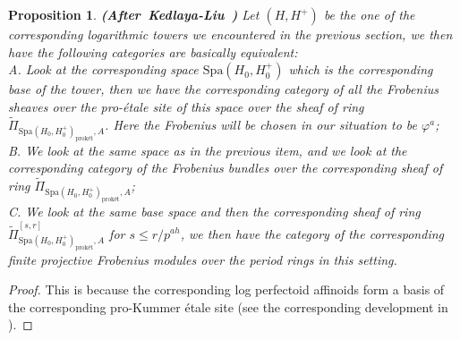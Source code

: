 \documentclass[12pt]{amsart}
\newtheorem{proposition}[theorem]{Proposition}
\theoremstyle{definition}
\numberwithin{equation}{section}
\begin{document}
\begin{proposition} \mbox{\bf{(After Kedlaya-Liu \cite[Lemma 5.4.11]{KL16})}}
Let $(H,H^+)$ be the one of the corresponding logarithmic towers we encountered in the previous section, we then have the following categories are basically equivalent:\\
\noindent A. Look at the corresponding space $\mathrm{Spa}(H_0,H_0^+)$ which is the corresponding base of the tower, then we have the corresponding category of all the Frobenius sheaves over the pro-\'etale site of this space over the sheaf of ring $\widetilde{\Pi}_{\mathrm{Spa}(H_0,H_0^+)_\text{prok\'et},A}$. Here the Frobenius will be chosen in our situation to be $\varphi^a$;\\
\noindent B. We look at the same space as in the previous item, and we look at the corresponding category of the Frobenius bundles over the corresponding sheaf of ring $\widetilde{\Pi}_{\mathrm{Spa}(H_0,H_0^+)_\text{prok\'et},A}$;\\
\noindent C. We look at the same base space and then the corresponding sheaf of ring $\widetilde{\Pi}^{[s,r]}_{\mathrm{Spa}(H_0,H_0^+)_\text{prok\'et},A}$ for $s\leq r/p^{ah}$, we then have the category of the corresponding finite projective Frobenius modules over the period rings in this setting.\\
\end{proposition}


\begin{proof}
This is because the corresponding log perfectoid affinoids form a basis of the corresponding pro-Kummer \'etale site (see the corresponding development in \cite[Chapter 5.3]{DLLZ2}).
\end{proof}
\end{document}
